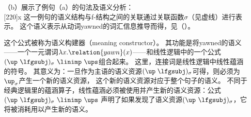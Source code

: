 （b）展示了例句（a）的句法及语义分析：
\eal
{}
\ex ~\\[-\baselineskip]
\hspace*{-2em}
{}%
\hspace*{3em}%
{}%
\hspace*{2em}%
\Aput*{$\phi$}
[220]{x}
\Bput*{$\sigma$}
\zl
% 
这一例句的语义结构与f-结构之间的关联通过关联函数$\sigma$（见虚线）进行表示。
这个语义表示从动词yawned的词汇信息推导而得，见（）。

\ea
{}
\z

\noindent 
这个公式被称为语义构建器（meaning constructor）。
其功能是将yawned的语义——一个一元谓词$\lambda x. \relation{yawn}(x)$——和线性逻辑中的一个公式
\mbox{$(\up\ \lfgsubj)_\sigma\ \linimp\ \ups$}组合起来。
这里，连接词\linimp 是线性逻辑中线性蕴涵的符号。
其意义为：一旦作为主语的语义资源$(\up\;\lfgsubj)_\sigma$可得，则必须为$\up_\sigma$产生一个新的语义资源，
这个新的语义资源对应于整个句子的语义。 
不同于经典逻辑里的蕴涵算子，线性蕴涵必须被使用并产生新的语义资源：公式\mbox{$(\up\ \lfgsubj)_\sigma\ \linimp\ \ups$}
声明了如果发现了语义资源\mbox{$(\up\  \lfgsubj)_\sigma$}，它将被消耗用以产生新的语义\ups。


